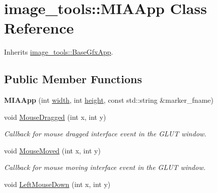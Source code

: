 \hypertarget{classimage__tools_1_1MIAApp}{}\section{image\+\_\+tools\+:\+:M\+I\+A\+App Class Reference}
\label{classimage__tools_1_1MIAApp}


Inherits \hyperlink{classimage__tools_1_1BaseGfxApp}{image\+\_\+tools\+::\+Base\+Gfx\+App}.

\subsection*{Public Member Functions}
\begin{DoxyCompactItemize}
\item 
{\bfseries M\+I\+A\+App} (int \hyperlink{classimage__tools_1_1BaseGfxApp_a2fe403c5392f624477c2ce4429f1a7b5}{width}, int \hyperlink{classimage__tools_1_1BaseGfxApp_aa961e13a7a8e6062204223cc33ac7503}{height}, const std\+::string \&marker\+\_\+fname)\hypertarget{classimage__tools_1_1MIAApp_a0fbfba996c29b82ef1c208e0ef0b802e}{}\label{classimage__tools_1_1MIAApp_a0fbfba996c29b82ef1c208e0ef0b802e}

\item 
void \hyperlink{classimage__tools_1_1MIAApp_a22de582c71210c873cde634130478158}{Mouse\+Dragged} (int x, int y)\hypertarget{classimage__tools_1_1MIAApp_a22de582c71210c873cde634130478158}{}\label{classimage__tools_1_1MIAApp_a22de582c71210c873cde634130478158}

\begin{DoxyCompactList}\small\item\em Callback for mouse dragged interface event in the G\+L\+UT window. \end{DoxyCompactList}\item 
void \hyperlink{classimage__tools_1_1MIAApp_afe0b149a45cba12ab1f93d54911caec5}{Mouse\+Moved} (int x, int y)
\begin{DoxyCompactList}\small\item\em Callback for mouse moving interface event in the G\+L\+UT window. \end{DoxyCompactList}\item 
void \hyperlink{classimage__tools_1_1MIAApp_afbfdd2f2d0773e1202c4610ffb077d11}{Left\+Mouse\+Down} (int x, int y)\hypertarget{classimage__tools_1_1MIAApp_afbfdd2f2d0773e1202c4610ffb077d11}{}\label{classimage__tools_1_1MIAApp_afbfdd2f2d0773e1202c4610ffb077d11}


\end{DoxyCompactItemize}
